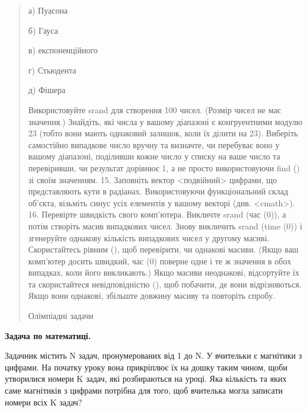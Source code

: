 \documentclass[]{article}
\begin{document}
\begin{quote}
а) Пуасона

б) Гауса

в) експоненційного

г) Стьюдента

д) Фішера

Використовуйте srand для створення 100 чисел. (Розмір чисел не має
значення.) Знайдіть, які числа у вашому діапазоні є конгруентними модулю
23 (тобто вони мають однаковий залишок, коли їх ділити на 23). Виберіть
самостійно випадкове число вручну та визначте, чи перебуває воно у
вашому діапазоні, поділивши кожне число у списку на ваше число та
перевіривши, чи результат дорівнює 1, а не просто використовуючи find ()
зі своїм значенням. 15. Заповніть вектор
\textless{}подвійний\textgreater{} цифрами, що представляють кути в
радіанах. Використовуючи функціональний склад об'єкта, візьміть синус
усіх елементів у вашому векторі (див. \textless{}cmath\textgreater{}).
16. Перевірте швидкість свого комп'ютера. Викличте srand (час (0)), а
потім створіть масив випадкових чисел. Знову викличить srand (time (0))
і згенеруйте однакову кількість випадкових чисел у другому масиві.
Скористайтесь рівним (), щоб перевірити, чи однакові масиви. (Якщо ваш
комп'ютер досить швидкий, час (0) поверне одне і те ж значення в обох
випадках, коли його викликають.) Якщо масиви неоднакові, відсортуйте їх
та скористайтеся невідповідністю (), щоб побачити, де вони
відрізняються. Якщо вони однакові, збільште довжину масиву та повторіть
спробу.

Олімпіадні задачи
\end{quote}

\textbf{Задача по математиці.}

Задачник містить N задач, пронумерованих від 1 до N. У вчительки є
магнітики з цифрами. На початку уроку вона прикріплює їх на дошку таким
чином, щоби утворилися номери K задач, які розбираються на уроці. Яка
кількість та яких саме магнітиків з цифрами потрібна для того, щоб
вчителька могла записати номери всіх K задач?
\end{document}
